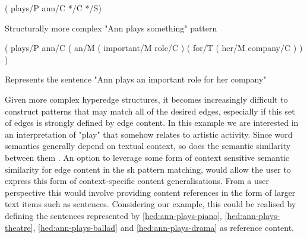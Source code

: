 \documentclass[11pt]{scrreprt}
\let\cite\parencite  %
\begin{document}
\begin{pattern}[h!]
  \normalfont\sffamily
  \centering
  ( plays/P ann/C */C */S)
  \caption{Structurally more complex "Ann plays something" pattern}
  \label{pat:ann-plays-something-complex}
\end{pattern}
  
\begin{hedge}[h!]
  \normalfont\sffamily
  \centering
( plays/P ann/C ( an/M ( important/M role/C ) ( for/T ( her/M company/C ) ) )
  \caption{Represents the sentence "Ann plays an important role for her company"}
  \label{hed:ann-plays-company}
\end{hedge}

Given more complex hyperedge structures, it becomes increasingly difficult to construct patterns that may match all of the desired edges, especially if this set of edges is strongly defined by edge content. In this example we are interested in an interpretation of "play" that somehow relates to artistic activity. Since word semantics generally depend on textual context, so does the semantic similarity between them \cite[Section 2.2.3]{harispeSemanticSimilarityNatural2015}. An option to leverage some form of context sensitive semantic similarity for edge content in the \gls{sh} pattern matching, would allow the user to express this form of context-specific content generalisations. From a user perspective this would involve providing content references in the form of larger text items such as sentences. Considering our example, this could be realised by defining the sentences represented by \cref{hed:ann-plays-piano}, \cref{hed:ann-plays-theatre}, \cref{hed:ann-plays-ballad} and \cref{hed:ann-plays-drama} as reference content.

\end{document}
